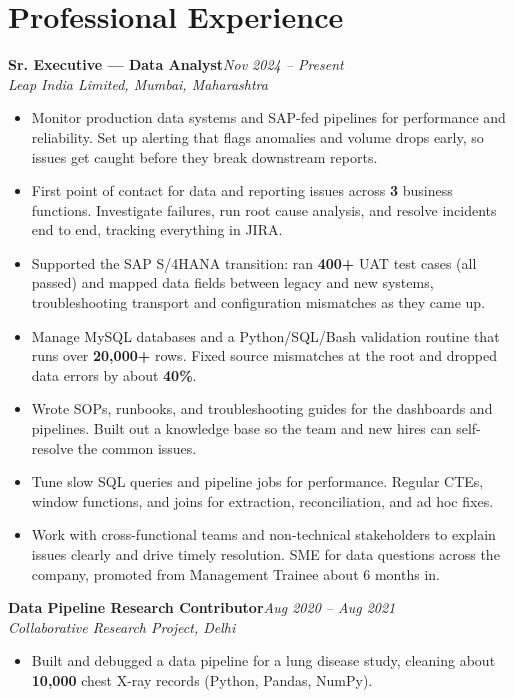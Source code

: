 \documentclass[10pt, letterpaper]{article}
\newcommand{\role}[3]{%
  \vspace{2pt}%
  {\bfseries #1}\hfill{\small\color{muted}\textit{#3}}\\[-2pt]%
  {\small\color{muted}\textit{#2}}%
}
\begin{document}
\section{Professional Experience}

\role{Sr. Executive --- Data Analyst}{Leap India Limited, Mumbai, Maharashtra}{Nov 2024 -- Present}

\begin{itemize}
  \item Monitor production data systems and SAP-fed pipelines for performance and reliability. Set up alerting that flags anomalies and volume drops early, so issues get caught before they break downstream reports.
  \item First point of contact for data and reporting issues across \textbf{3} business functions. Investigate failures, run root cause analysis, and resolve incidents end to end, tracking everything in JIRA.
  \item Supported the SAP S/4HANA transition: ran \textbf{400+} UAT test cases (all passed) and mapped data fields between legacy and new systems, troubleshooting transport and configuration mismatches as they came up.
  \item Manage MySQL databases and a Python/SQL/Bash validation routine that runs over \textbf{20,000+} rows. Fixed source mismatches at the root and dropped data errors by about \textbf{40\%}.
  \item Wrote SOPs, runbooks, and troubleshooting guides for the dashboards and pipelines. Built out a knowledge base so the team and new hires can self-resolve the common issues.
  \item Tune slow SQL queries and pipeline jobs for performance. Regular CTEs, window functions, and joins for extraction, reconciliation, and ad hoc fixes.
  \item Work with cross-functional teams and non-technical stakeholders to explain issues clearly and drive timely resolution. SME for data questions across the company, promoted from Management Trainee about 6 months in.
\end{itemize}

\vspace{1pt}

\role{Data Pipeline Research Contributor}{Collaborative Research Project, Delhi}{Aug 2020 -- Aug 2021}

\begin{itemize}
  \item Built and debugged a data pipeline for a lung disease study, cleaning about \textbf{10,000} chest X-ray records (Python, Pandas, NumPy).
\end{itemize}
\end{document}
